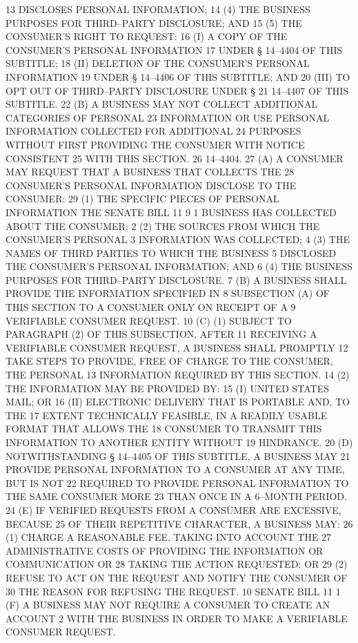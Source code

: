13 DISCLOSES PERSONAL INFORMATION;
14 (4) THE BUSINESS PURPOSES FOR THIRD–PARTY DISCLOSURE; AND
15 (5) THE CONSUMER’S RIGHT TO REQUEST:
16 (I) A COPY OF THE CONSUMER’S PERSONAL INFORMATION
17 UNDER § 14–4404 OF THIS SUBTITLE;
18 (II) DELETION OF THE CONSUMER’S PERSONAL INFORMATION
19 UNDER § 14–4406 OF THIS SUBTITLE; AND
20 (III) TO OPT OUT OF THIRD–PARTY DISCLOSURE UNDER §
21 14–4407 OF THIS SUBTITLE.
22 (B) A BUSINESS MAY NOT COLLECT ADDITIONAL CATEGORIES OF PERSONAL
23 INFORMATION OR USE PERSONAL INFORMATION COLLECTED FOR ADDITIONAL
24 PURPOSES WITHOUT FIRST PROVIDING THE CONSUMER WITH NOTICE CONSISTENT
25 WITH THIS SECTION.
26 14–4404.
27 (A) A CONSUMER MAY REQUEST THAT A BUSINESS THAT COLLECTS THE
28 CONSUMER’S PERSONAL INFORMATION DISCLOSE TO THE CONSUMER:
29 (1) THE SPECIFIC PIECES OF PERSONAL INFORMATION THE 
SENATE BILL 11 9
1 BUSINESS HAS COLLECTED ABOUT THE CONSUMER;
2 (2) THE SOURCES FROM WHICH THE CONSUMER’S PERSONAL
3 INFORMATION WAS COLLECTED;
4 (3) THE NAMES OF THIRD PARTIES TO WHICH THE BUSINESS
5 DISCLOSED THE CONSUMER’S PERSONAL INFORMATION; AND
6 (4) THE BUSINESS PURPOSES FOR THIRD–PARTY DISCLOSURE.
7 (B) A BUSINESS SHALL PROVIDE THE INFORMATION SPECIFIED IN
8 SUBSECTION (A) OF THIS SECTION TO A CONSUMER ONLY ON RECEIPT OF A
9 VERIFIABLE CONSUMER REQUEST.
10 (C) (1) SUBJECT TO PARAGRAPH (2) OF THIS SUBSECTION, AFTER
11 RECEIVING A VERIFIABLE CONSUMER REQUEST, A BUSINESS SHALL PROMPTLY
12 TAKE STEPS TO PROVIDE, FREE OF CHARGE TO THE CONSUMER, THE PERSONAL
13 INFORMATION REQUIRED BY THIS SECTION.
14 (2) THE INFORMATION MAY BE PROVIDED BY:
15 (I) UNITED STATES MAIL; OR
16 (II) ELECTRONIC DELIVERY THAT IS PORTABLE AND, TO THE
17 EXTENT TECHNICALLY FEASIBLE, IN A READILY USABLE FORMAT THAT ALLOWS THE
18 CONSUMER TO TRANSMIT THIS INFORMATION TO ANOTHER ENTITY WITHOUT
19 HINDRANCE.
20 (D) NOTWITHSTANDING § 14–4405 OF THIS SUBTITLE, A BUSINESS MAY
21 PROVIDE PERSONAL INFORMATION TO A CONSUMER AT ANY TIME, BUT IS NOT
22 REQUIRED TO PROVIDE PERSONAL INFORMATION TO THE SAME CONSUMER MORE
23 THAN ONCE IN A 6–MONTH PERIOD.
24 (E) IF VERIFIED REQUESTS FROM A CONSUMER ARE EXCESSIVE, BECAUSE
25 OF THEIR REPETITIVE CHARACTER, A BUSINESS MAY:
26 (1) CHARGE A REASONABLE FEE, TAKING INTO ACCOUNT THE
27 ADMINISTRATIVE COSTS OF PROVIDING THE INFORMATION OR COMMUNICATION OR
28 TAKING THE ACTION REQUESTED; OR
29 (2) REFUSE TO ACT ON THE REQUEST AND NOTIFY THE CONSUMER OF
30 THE REASON FOR REFUSING THE REQUEST.
10 SENATE BILL 11
1 (F) A BUSINESS MAY NOT REQUIRE A CONSUMER TO CREATE AN ACCOUNT
2 WITH THE BUSINESS IN ORDER TO MAKE A VERIFIABLE CONSUMER REQUEST.
